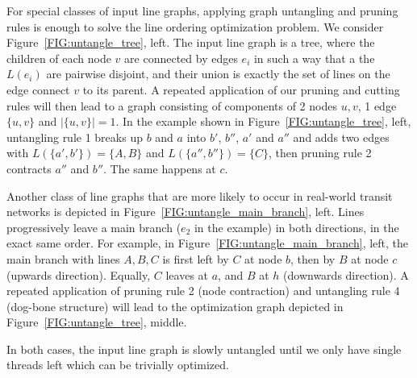 \documentclass[format=acmsmall, review=false, screen=true]{acmart}
\begin{document}
For special classes of input line graphs, applying graph untangling and pruning rules is enough to solve the line ordering optimization problem.
We consider Figure~\ref{FIG:untangle_tree}, left.
The input line graph is a tree, where the children of each node $v$ are connected by edges $e_i$ in such a way that a the $L(e_i)$ are pairwise disjoint, and their union is exactly the set of lines on the edge connect $v$ to its parent.
A repeated application of our pruning and cutting rules will then lead to a graph consisting of components of 2 nodes $u, v$, 1 edge $\{u, v\}$ and $|\{u, v\}| = 1$.
In the example shown in Figure~\ref{FIG:untangle_tree}, left, untangling rule 1 breaks up $b$ and $a$ into $b'$, $b''$, $a'$ and $a''$ and adds two edges with $L(\{a', b'\})=\{A, B\}$ and $L(\{a'', b''\}) = \{C\}$, then pruning rule 2 contracts $a''$ and $b''$.
The same happens at $c$.

Another class of line graphs that are more likely to occur in real-world transit networks is depicted in Figure~\ref{FIG:untangle_main_branch}, left.
Lines progressively leave a main branch ($e_2$ in the example) in both directions, in the exact same order.
For example, in Figure~\ref{FIG:untangle_main_branch}, left, the main branch with lines $A, B, C$ is first left by $C$ at node $b$, then by $B$ at node $c$ (upwards direction). Equally, $C$ leaves at $a$, and $B$ at $h$ (downwards direction).
A repeated application of pruning rule 2 (node contraction) and untangling rule 4 (dog-bone structure) will lead to the optimization graph depicted in Figure~\ref{FIG:untangle_tree}, middle. 

In both cases, the input line graph is slowly untangled until we only have single threads left which can be trivially optimized.
\end{document}
